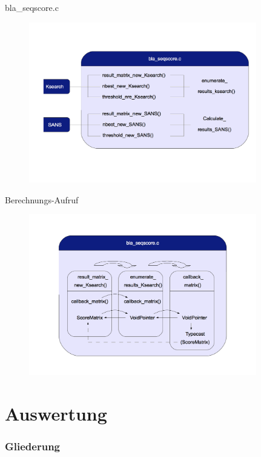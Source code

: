 \documentclass[xcolor=dvipsnames, aspectratio=1610]{beamer}
\begin{document}
\begin{frame}{bla\_seqscore.c}
  \begin{figure}[h]
    \includegraphics[height=7cm]{img/dia2.png}
  \end{figure}
\end{frame}

\begin{frame}{Berechnungs-Aufruf}
  \begin{figure}[h]
    \includegraphics[height=7cm]{img/dia3.png}
  \end{figure}
\end{frame}

\section{Auswertung}
  \begin{frame} 
    \frametitle{Gliederung}
    \tableofcontents[currentsection]
  \end{frame}
\end{document}
